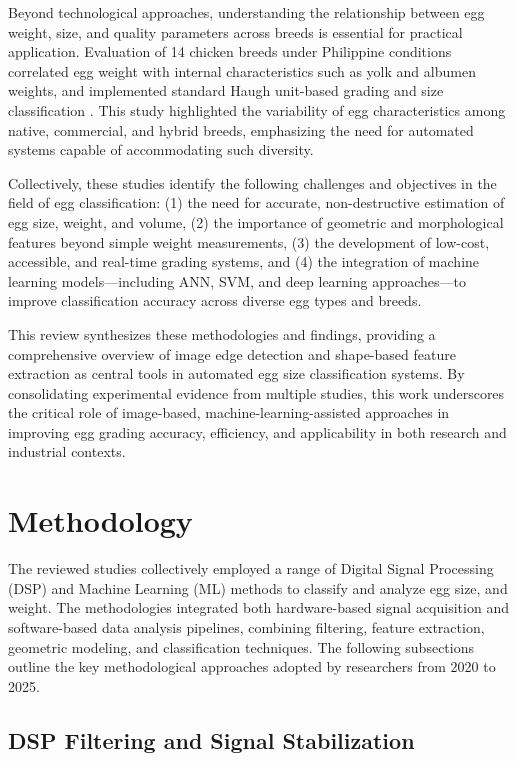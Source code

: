 \documentclass[conference]{IEEEtran}
\begin{document}
	Beyond technological approaches, understanding the relationship between egg weight, size, and quality parameters across breeds is essential for practical application. Evaluation of 14 chicken breeds under Philippine conditions correlated egg weight with internal characteristics such as yolk and albumen weights, and implemented standard Haugh unit-based grading and size classification \cite{bondoc2021}. This study highlighted the variability of egg characteristics among native, commercial, and hybrid breeds, emphasizing the need for automated systems capable of accommodating such diversity.
	
	Collectively, these studies identify the following challenges and objectives in the field of egg classification: (1) the need for accurate, non-destructive estimation of egg size, weight, and volume, (2) the importance of geometric and morphological features beyond simple weight measurements, (3) the development of low-cost, accessible, and real-time grading systems, and (4) the integration of machine learning models—including ANN, SVM, and deep learning approaches—to improve classification accuracy across diverse egg types and breeds.
	
	This review synthesizes these methodologies and findings, providing a comprehensive overview of image edge detection and shape-based feature extraction as central tools in automated egg size classification systems. By consolidating experimental evidence from multiple studies, this work underscores the critical role of image-based, machine-learning-assisted approaches in improving egg grading accuracy, efficiency, and applicability in both research and industrial contexts.
	
	\section{Methodology}
	
	The reviewed studies collectively employed a range of Digital Signal Processing (DSP) and Machine Learning (ML) methods to classify and analyze egg size, and weight. The methodologies integrated both hardware-based signal acquisition and software-based data analysis pipelines, combining filtering, feature extraction, geometric modeling, and classification techniques. The following subsections outline the key methodological approaches adopted by researchers from 2020 to 2025.
	
	\subsection{DSP Filtering and Signal Stabilization}
	
\end{document}
